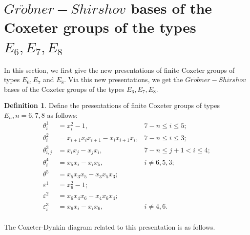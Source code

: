 \documentclass[UTF8]{amsart}
\theoremstyle{definition}
\newtheorem{definition}[tpcl]{Definition}
\theoremstyle{remark}
\numberwithin{equation}{section}
\begin{document}
\section{$Gr\ddot{o}bner-Shirshov$ bases  of the Coxeter groups of the types  $E_6,E_7,E_8$}\label{e}
In this section, we first give the new presentations of finite Coxeter groups of types $E_6,E_7$ and $E_8$. Via this new presentations, we get the $Gr\ddot{o}bner-Shirshov$ bases  of the Coxeter groups of the types  $E_6,E_7,E_8$.
\begin{definition}\label{initial}
Define the presentations of finite Coxeter groups of types $E_n, n=6,7,8$ as follows:
\begin{equation}\label{E7-1}
\begin{aligned}
\theta_i^1&=x_i^2-1 ,&7-n\leq i\leq 5;\\
\theta_i^2&=x_{i+1}x_ix_{i+1}-x_ix_{i+1}x_i ,&7-n\leq i\leq 3;\\
\theta_{i,j}^3&=x_ix_j-x_jx_i ,&7-n\leq j+1<i\leq 4;\\
\theta_i^4&=x_{5}x_i-x_ix_{5}, &i\ne 6,5,3;\\
\theta^5&=x_{5}x_{3}x_{5}-x_{3}x_{5}x_{3};& \\
\varepsilon^1&=x_6^2-1;&\\
\varepsilon^2&=x_6x_{4}x_6-x_{4}x_6x_{4} ;&\\
\varepsilon_i^3&=x_6x_i-x_ix_6 ,&i\ne 4,6.\\
\end{aligned}
\end{equation}
\end{definition}
The Coxeter-Dynkin diagram related to this presentation  is as follows.
\begin{center}
\end{center}
\end{document}
